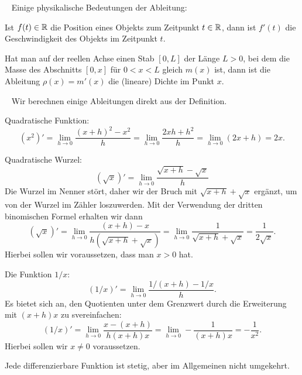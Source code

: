 \begin{bem} {\ } Einige physikalische Bedeutungen der Ableitung:
	\begin{enuma}
		\item Ist $f(t) \in \mathbb{R}$ die Position eines Objekts zum Zeitpunkt $t \in \mathbb{R}$, dann ist $f'(t)$ die Geschwindigkeit des Objekts im Zeitpunkt $t$. 
		\item Hat man auf der reellen Achse einen Stab $[0,L]$ der Länge $L>0$, bei dem die Masse des Abschnitts $[0,x]$ für $0< x < L$ gleich $m(x)$ ist, dann ist die Ableitung $\rho(x) = m'(x)$ die (lineare) Dichte im Punkt $x$. 
	\end{enuma} 
\end{bem} 

\begin{bsp} {\ } 
	Wir berechnen einige Ableitungen direkt aus der Definition. 
	\begin{enuma}
	\item Quadratische Funktion: 
	\[
		(x^2)' = \lim_{h \to 0} \frac{(x+h)^2 - x^2}{h} = \lim_{h \to 0} \frac{2 x h + h^2}{h} = \lim_{h \to 0} (2 x  + h) = 2 x. 
	\]
	\item Quadratische Wurzel: 
	\[
		(\sqrt{x})' = \lim_{h \to 0} \frac{\sqrt{x+h} - \sqrt{x}}{h} 
	\]
	Die Wurzel im Nenner stört, daher wir der Bruch mit $\sqrt{x+h} +  \sqrt{x}$ ergänzt, um von der Wurzel im Zähler loszuwerden. Mit der Verwendung der dritten binomischen Formel erhalten wir dann
	\[
		(\sqrt{x})' = \lim_{h \to 0} \frac{ (x+h) - x} { h (\sqrt{x + h} + \sqrt{x}) } = \lim_{h \to 0} \frac{1}{\sqrt{x+h} + \sqrt{x}} = \frac{1}{2 \sqrt{x}}.  
	\]
	Hierbei sollen wir voraussetzen, dass man $x> 0$ hat. 
	\item Die Funktion $1/x$: 
	\[
		(1/x)' = \lim_{h \to 0} \frac{1/(x+h) - 1/x}{h}. 
	\]
	Es bietet sich an, den Quotienten unter dem Grenzwert durch die Erweiterung mit $(x+h) x$ zu svereinfachen: 
	\[
		(1/x)'= \lim_{h \to 0} \frac{ x - (x+h)}{h (x+h) x} = \lim_{h \to 0} - \frac{1}{(x+h) x} =  - \frac{1}{x^2}. 
	\]
	Hierbei sollen wir $x \ne 0$ voraussetzen. 
	\end{enuma} 
\end{bsp} 

\begin{thm}
	Jede differenzierbare Funktion ist stetig, aber im Allgemeinen nicht umgekehrt. 
\end{thm} 

